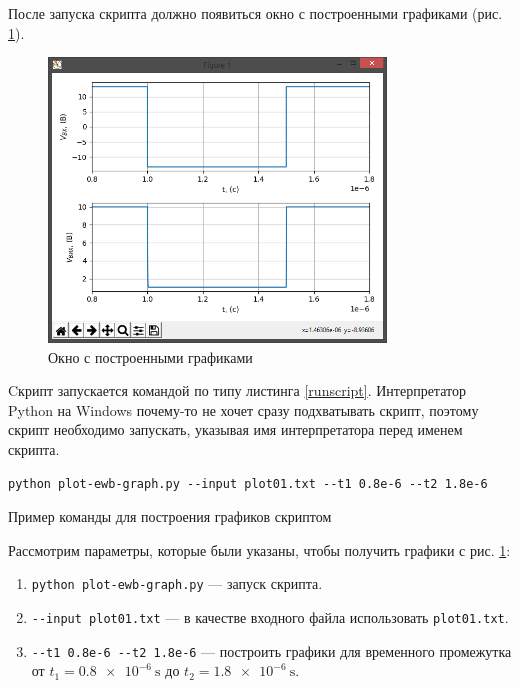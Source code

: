 \documentclass[a4paper,oneside,DIV=10,12pt]{scrartcl}
\newcommand\filename[1]{\texttt{#1}}
\begin{document}
		После запуска скрипта должно появиться окно с построенными графиками (рис. \ref{fig:plots}).
		
		\begin{figure}[H]
			\centering
			\includegraphics[width=0.8\textwidth]{step05.png}
			\caption{Окно с построенными графиками}
			\label{fig:plots} 
		\end{figure}
		
		Cкрипт запускается командой по типу листинга \ref{runscript}. Интерпретатор Python на Windows почему-то не хочет сразу подхватывать скрипт, поэтому скрипт необходимо запускать, указывая имя интерпретатора перед именем скрипта.
		
		\begin{lstfloat}
			\begin{lstlisting}
python plot-ewb-graph.py --input plot01.txt --t1 0.8e-6 --t2 1.8e-6
			\end{lstlisting}
			\caption{Пример команды для построения графиков скриптом}
			\label{runscript}
		\end{lstfloat}
		
		Рассмотрим параметры, которые были указаны, чтобы получить графики с рис. \ref{fig:plots}:
		\begin{enumerate}
			\item \lstinline!python plot-ewb-graph.py! --- запуск скрипта.
		
			\item \lstinline!--input plot01.txt! --- в качестве входного файла использовать \filename{plot01.txt}.
		
			\item \lstinline!--t1 0.8e-6 --t2 1.8e-6! --- построить графики для временного промежутка от $t_1 = \SI{0.8e-6}{\second}$ до $t_2 = \SI{1.8e-6}{\second}$.
		\end{enumerate}
		
\end{document}
